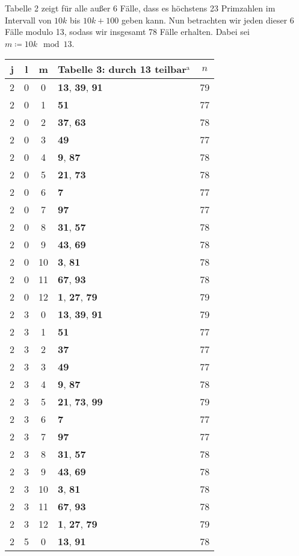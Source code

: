 \documentclass{article}
\begin{document}
Tabelle 2 zeigt für alle außer 6 Fälle, dass es höchstens 23 Primzahlen im Intervall von $10k$ bis $10k+100$ geben kann. Nun betrachten wir jeden dieser 6 Fälle modulo 13, sodass wir insgesamt 78 Fälle erhalten. Dabei sei $m\coloneqq 10k \mod 13$.\\
\begin{minipage}[t]{0.5\textwidth}
\vspace{0pt}
\begin{flushleft}
\begin{tabular}{||c|c|c|l|c||}
	j&l&m&Tabelle 3: durch 13 teilbar$^{\mathrm{a}}$&$n$\\
	\hline
	2&0&0&\textbf{13}, \textbf{39}, \textbf{91}&79\\
	2&0&1&\textbf{51}&77\\
	2&0&2&\textbf{37}, \textbf{63}&78\\
	2&0&3&\textbf{49}&77\\
	2&0&4&\textbf{9}, \textbf{87}&78\\
	2&0&5&\textbf{21}, \textbf{73}&78\\
	2&0&6&\textbf{7}&77\\
	2&0&7&\textbf{97}&77\\
	2&0&8&\textbf{31}, \textbf{57}&78\\
	2&0&9&\textbf{43}, \textbf{69}&78\\
	2&0&10&\textbf{3}, \textbf{81}&78\\
	2&0&11&\textbf{67}, \textbf{93}&78\\
	2&0&12&\textbf{1}, \textbf{27}, \textbf{79}&79\\
	2&3&0&\textbf{13}, \textbf{39}, \textbf{91}&79\\
	2&3&1&\textbf{51}&77\\
	2&3&2&\textbf{37}&77\\
	2&3&3&\textbf{49}&77\\
	2&3&4&\textbf{9}, \textbf{87}&78\\
	2&3&5&\textbf{21}, \textbf{73}, \textbf{99}&79\\
	2&3&6&\textbf{7}&77\\
	2&3&7&\textbf{97}&77\\
	2&3&8&\textbf{31}, \textbf{57}&78\\
	2&3&9&\textbf{43}, \textbf{69}&78\\
	2&3&10&\textbf{3}, \textbf{81}&78\\
	2&3&11&\textbf{67}, \textbf{93}&78\\
	2&3&12&\textbf{1}, \textbf{27}, \textbf{79}&79\\
	2&5&0&\textbf{13}, \textbf{91}&78\\

\end{tabular}
\end{flushleft}
\end{minipage}
\end{document}
